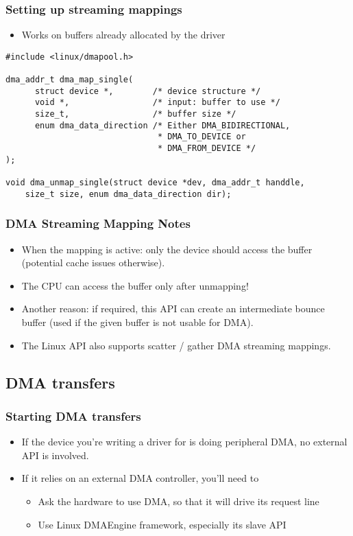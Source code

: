 \begin{frame}[fragile]
  \frametitle{Setting up streaming mappings}
  \begin{itemize}
  \item Works on buffers already allocated by the driver
  \end{itemize}
\begin{verbatim}
#include <linux/dmapool.h>

dma_addr_t dma_map_single(
      struct device *,        /* device structure */
      void *,                 /* input: buffer to use */
      size_t,                 /* buffer size */
      enum dma_data_direction /* Either DMA_BIDIRECTIONAL,
                               * DMA_TO_DEVICE or
                               * DMA_FROM_DEVICE */
);

void dma_unmap_single(struct device *dev, dma_addr_t handdle,
    size_t size, enum dma_data_direction dir);
\end{verbatim}
\end{frame}

\begin{frame}
  \frametitle{DMA Streaming Mapping Notes}
  \begin{itemize}
  \item When the mapping is active: only the device should access the
    buffer (potential cache issues otherwise).
  \item The CPU can access the buffer only after unmapping!
  \item Another reason: if required, this API can create an
    intermediate bounce buffer (used if the given buffer is not usable
    for DMA).
  \item The Linux API also supports scatter / gather DMA streaming
    mappings.
  \end{itemize}
\end{frame}

\subsection{DMA transfers}

\begin{frame}
  \frametitle{Starting DMA transfers}
  \begin{itemize}
  \item If the device you're writing a driver for is doing peripheral
    DMA, no external API is involved.
  \item If it relies on an external DMA controller, you'll need to
    \begin{itemize}
    \item Ask the hardware to use DMA, so that it will drive its
      request line
    \item Use Linux DMAEngine framework, especially its slave API
    \end{itemize}
  \end{itemize}
\end{frame}

